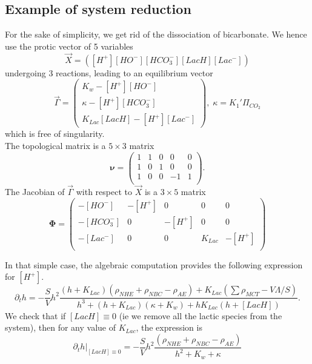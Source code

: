 \documentclass{revtex4}
\begin{document}
\subsection{Example of system reduction}
For the sake of simplicity, we get rid of the dissociation of bicarbonate.
We hence use the protic vector of 5 variables
\begin{equation}
	\vec{X} = \left( \left[H^+\right]  \left[HO^-\right] \left[HCO_3^-\right] \left[LacH\right]  \left[Lac^-\right] \right)
\end{equation}
undergoing 3 reactions, leading to an equilibrium vector
\begin{equation}
	\vec{\Gamma} =
	 \begin{pmatrix}
	K_w - \left[H^+\right]  \left[HO^-\right]\\
	 \kappa - \left[H^+\right]\left[HCO_3^-\right]\\
	K_{Lac}\left[LacH\right] - \left[H^+\right]\left[Lac^-\right]
	\end{pmatrix}, \;\kappa=K_1'\Pi_{CO_2}
\end{equation}
which is free of singularity.\\
The topological matrix is a $5\times3$ matrix
\begin{equation}
	\boldsymbol{\nu} =
	\begin{pmatrix}
	1 & 1 & 0 &  0 & 0\\
	1 & 0 & 1 &  0 & 0\\
	1 & 0 & 0 &  -1 & 1\\
	\end{pmatrix}.
\end{equation}
The Jacobian of $\vec{\Gamma}$ with respect to $\vec{X}$ is a $3\times5$ matrix 
\begin{equation}
	\boldsymbol{\Phi} = 
	\begin{pmatrix}
	-\left[HO^-\right]   & -\left[H^+\right] & 0              & 0 & 0    \\
	-\left[HCO_3^-\right]& 0                 & -\left[H^+\right] & 0 & 0 \\
	-\left[Lac^-\right]  & 0                 & 0                 & K_{Lac}  &  -\left[H^+\right] \\
	\end{pmatrix}
\end{equation}

In that simple case, the algebraic computation provides the following expression for $\left[H^+\right]$.
\begin{equation}
\partial_t h = - \dfrac{S}{V} h^2
\dfrac{\left(h+K_{Lac}\right)\left(\rho_{NHE}+\rho_{NBC}-\rho_{AE}\right)+K_{Lac}\left(\sum \rho_{MCT}-V\Lambda/S\right)}
{h^3+(h+K_{Lac})\left(\kappa+K_w\right)+h K_{Lac}\left(h+\left[LacH\right]\right)}.
\end{equation}
We check that if $\left[LacH\right]\equiv0$ (ie we remove all the lactic species from the system), then for any value of $K_{Lac}$, the expression is
$$
	\partial_t h\vert_{\left[LacH\right]\equiv0} = 
	-\dfrac{S}{V} h^2
	\dfrac{\left(\rho_{NHE}+\rho_{NBC}-\rho_{AE}\right)}{h^2+K_w+\kappa}
$$
\end{document}
